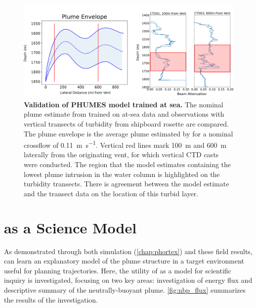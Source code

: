 \begin{figure}
    \centering
    \includegraphics[width=1\columnwidth]{figures/field_validation.png}
    \caption[Validation of \PHUMES model trained at sea.]{\textbf{Validation of PHUMES model trained at sea.} The nominal plume estimate from \PHUMES trained on at-sea data and \Sentry observations with vertical transects of turbidity from shipboard rosette are compared. The plume envelope is the average plume estimated by \PHUMES for a nominal crossflow of \SI{0.11}{\meter\per\second}. Vertical red lines mark \SI{100}{\meter} and \SI{600}{\meter} laterally from the originating vent, for which vertical CTD casts were conducted. The region that the model estimates containing the lowest plume intrusion in the water column is highlighted on the turbidity transects. There is agreement between the model estimate and the transect data on the location of this turbid layer.} 
    \label{fig:field_valid}
\end{figure}

\section{\PHUMES as a Science Model}
\label{sec:phumes_as_science}
As demonstrated through both simulation (\cref{chap:phortex}) and these field results, \PHUMES can learn an explanatory model of the plume structure in a target environment useful for planning \PHORTEX trajectories. Here, the utility of \PHUMES as a model for scientific inquiry is investigated, focusing on two key areas: investigation of energy flux and descriptive summary of the neutrally-buoyant plume. \cref{fig:nbp_flux} summarizes the results of the investigation.

